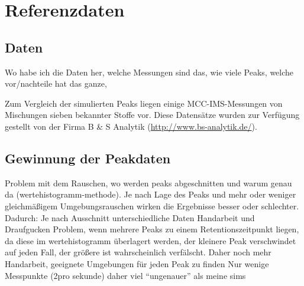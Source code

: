 \chapter{Referenzdaten}
\label{chapter:ref}


\section{Daten}
Wo habe ich die Daten her, welche Messungen sind das, wie viele Peaks, welche vor/nachteile hat das ganze, 

Zum Vergleich der simulierten Peaks liegen einige MCC-IMS-Messungen von Mischungen sieben bekannter Stoffe vor. Diese Datensätze wurden zur Verfügung gestellt von der Firma B \& S Analytik  (\mbox{\url{http://www.bs-analytik.de/}}). 

\section{Gewinnung der Peakdaten}
Problem mit dem Rauschen, wo werden peaks abgeschnitten und warum genau da (wertehistogramm-methode). Je nach Lage des Peaks und mehr oder weniger gleichmäßigem Umgebungsrauschen wirken die Ergebnisse besser oder schlechter.
Dadurch: Je nach Ausschnitt unterschiedliche Daten
Handarbeit und Draufgucken
Problem, wenn mehrere Peaks zu einem Retentionszeitpunkt liegen, da diese im wertehistogramm überlagert werden, der kleinere Peak verschwindet auf jeden Fall, der größere ist wahrscheinlich verfälscht. Daher noch mehr Handarbeit, geeignete Umgebungen für jeden Peak zu finden
Nur wenige Messpunkte (2pro sekunde) daher viel ``ungenauer'' als meine sims